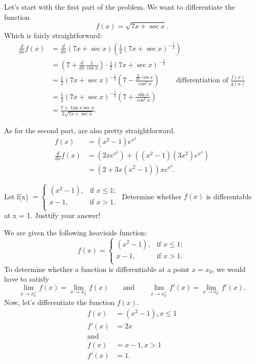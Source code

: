 \documentclass[a4paper]{article}
\begin{document}
Let's start with the first part of the problem. We want to differentiate the function \[
f(x) = \sqrt{7x + \sec x}  
.\] 
Which is fairly straightforward:
\begin{align*}
	\frac{d}{dx} f(x) &= \frac{d}{dx}(7x + \sec x) (\frac{1}{2} (7x + \sec x)^{- \frac{1}{2}}) \\
			  &= (7 + \frac{d}{dx} \frac{1}{\cos x}) \cdot \frac{1}{2} (7x + \sec x)^{-\frac{1}{2}}\\
			  &=\frac{1}{2} (7x + \sec x)^{-\frac{1}{2}}(7 - \frac{\frac{d}{dx} \cos x}{\cos^2 x}) \qquad \text{ differentiation of } \frac{f(x)}{g(x)} \\
			  &= \frac{1}{2}(7x + \sec x)^{-\frac{1}{2}} (7 + \frac{\sin x}{\cos^2 x}) \\
			  &\boxed{=\frac{7 + \tan x \sec x}{2\sqrt{7x + \sec x}}}  
.\end{align*}

As for the second part, are also pretty straightforward.
\begin{align*}
	f(x) &= (x^2 - 1) e^{x^{3}} \\
	\frac{d}{dx} f(x) &=  (2x e^{x^{3}}) + ((x^2 - 1)(3x^2)e^{x^{3}}) \\
			  &\boxed{= (2 + 3x(x^2 - 1))x e^{x^{3}} }
.\end{align*}


\begin{tcolorbox}[title=Question 5]
Let f(x) $ =
\begin{cases}
	(x^2 - 1), & \text{if } x \le 1; \\
	x-1, & \text{if } x > 1.\\
\end{cases}
$ Determine whether $f(x)$ is differentable at x = 1. Justtify your answer!
\end{tcolorbox}
\vspace{5pt}
We are given the following heaviside function: \[
f(x) =
\begin{cases}
	(x^2 - 1), & \text{if } x \le 1; \\
	x-1, & \text{if } x > 1. \\
\end{cases}
\] 
To determine whether a function is differentiable at a point $x = x_0$, we would have to satisfy  \[
	\boxed{\lim_{x \to x_0^{+}} f(x) = \lim_{x \to x_0^{-}} f(x)} \qquad \text{and} \qquad  \boxed{\lim_{x \to x_0^{+}} f'(x) = \lim_{x \to x_0^{-}} f'(x).}        
\] 
\noindent Now, let's differentiate the function $f(x)$.
 \begin{align*}
	f(x) &= (x^2 - 1), x \le 1 \\
	f'(x) &= 2x \\
	\text{and     }& \\
	f(x) &= x - 1, x > 1 \\
	f'(x) &= 1 
.\end{align*}
\end{document}
